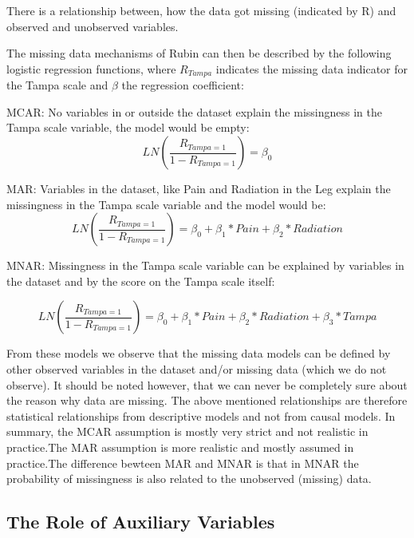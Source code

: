\documentclass[]{book}
\begin{document}
There is a relationship between, how the data got missing (indicated by
R) and observed and unobserved variables.

The missing data mechanisms of Rubin can then be described by the
following logistic regression functions, where \(R_{Tampa}\) indicates
the missing data indicator for the Tampa scale and \(\beta\) the
regression coefficient:

MCAR: No variables in or outside the dataset explain the missingness in
the Tampa scale variable, the model would be empty:
\[LN(\frac{R_{Tampa=1}}{1-R_{Tampa=1}}) = \beta_0\]

MAR: Variables in the dataset, like Pain and Radiation in the Leg
explain the missingness in the Tampa scale variable and the model would
be:
\[LN(\frac{R_{Tampa=1}}{1-R_{Tampa=1}}) = \beta_0 + \beta_1 * Pain + \beta_2 * Radiation\]

MNAR: Missingness in the Tampa scale variable can be explained by
variables in the dataset and by the score on the Tampa scale itself:

\[LN(\frac{R_{Tampa=1}}{1-R_{Tampa=1}}) = \beta_0 + \beta_1 * Pain + \beta_2 * Radiation + \beta_3 * Tampa\]

From these models we observe that the missing data models can be defined
by other observed variables in the dataset and/or missing data (which we
do not observe). It should be noted however, that we can never be
completely sure about the reason why data are missing. The above
mentioned relationships are therefore statistical relationships from
descriptive models and not from causal models. In summary, the MCAR
assumption is mostly very strict and not realistic in practice.The MAR
assumption is more realistic and mostly assumed in practice.The
difference bewteen MAR and MNAR is that in MNAR the probability of
missingness is also related to the unobserved (missing) data.

\subsection{The Role of Auxiliary
Variables}\label{the-role-of-auxiliary-variables}
\end{document}
